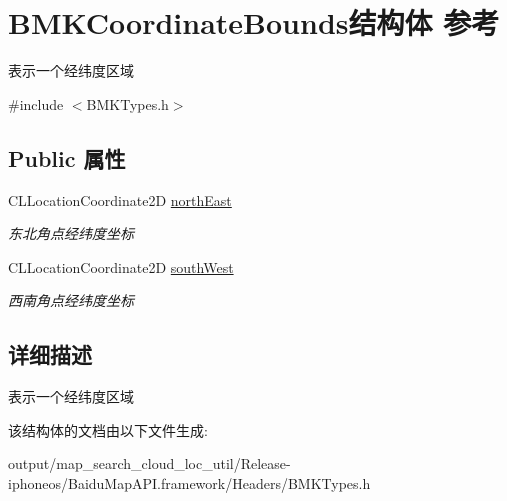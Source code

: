 \hypertarget{struct_b_m_k_coordinate_bounds}{}\section{B\+M\+K\+Coordinate\+Bounds结构体 参考}
\label{struct_b_m_k_coordinate_bounds}


表示一个经纬度区域  




{\ttfamily \#include $<$B\+M\+K\+Types.\+h$>$}

\subsection*{Public 属性}
\begin{DoxyCompactItemize}
\item 
\hypertarget{struct_b_m_k_coordinate_bounds_a0ebf42cb8682f2a6990fc7c6e439702e}{}C\+L\+Location\+Coordinate2\+D \hyperlink{struct_b_m_k_coordinate_bounds_a0ebf42cb8682f2a6990fc7c6e439702e}{north\+East}\label{struct_b_m_k_coordinate_bounds_a0ebf42cb8682f2a6990fc7c6e439702e}

\begin{DoxyCompactList}\small\item\em 东北角点经纬度坐标 \end{DoxyCompactList}\item 
\hypertarget{struct_b_m_k_coordinate_bounds_afd02c24b2ffe5aba18a125a48cdd1c37}{}C\+L\+Location\+Coordinate2\+D \hyperlink{struct_b_m_k_coordinate_bounds_afd02c24b2ffe5aba18a125a48cdd1c37}{south\+West}\label{struct_b_m_k_coordinate_bounds_afd02c24b2ffe5aba18a125a48cdd1c37}

\begin{DoxyCompactList}\small\item\em 西南角点经纬度坐标 \end{DoxyCompactList}\end{DoxyCompactItemize}


\subsection{详细描述}
表示一个经纬度区域 

该结构体的文档由以下文件生成\+:\begin{DoxyCompactItemize}
\item 
output/map\+\_\+search\+\_\+cloud\+\_\+loc\+\_\+util/\+Release-\/iphoneos/\+Baidu\+Map\+A\+P\+I.\+framework/\+Headers/B\+M\+K\+Types.\+h\end{DoxyCompactItemize}
